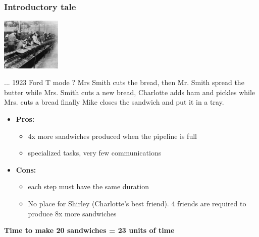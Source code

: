 \begin{frame}[containsverbatim]
\frametitle{Introductory tale}
\begin{center}
        {\includegraphics[height=2.5cm]{Day0/images/ford.jpg}}
\end{center}
\begin{center}
... 1923 Ford T mode ? Mrs Smith cuts the bread, then Mr. Smith spread the butter while Mrs. Smith cuts a new bread, Charlotte adds ham and pickles while Mrs. cuts a bread finally Mike closes the sandwich and put it in a tray.
\end{center}
\begin{center}
\begin{itemize}
	\item{\textbf{Pros: }
		\begin{itemize}
			\item{4x more sandwiches produced when the pipeline is full}
			\item{specialized tasks, very few communications}
		\end{itemize}
	}
	\item{\textbf{Cons: }
		\begin{itemize}
			\item{each step must have the same duration}
			\item{No place for Shirley (Charlotte's best friend). 4 friends are required to produce 8x more sandwiches}
		\end{itemize}
	}
\end{itemize}
\textbf{Time to make 20 sandwiches = 23 units of time}
\end{center}
\end{frame}

